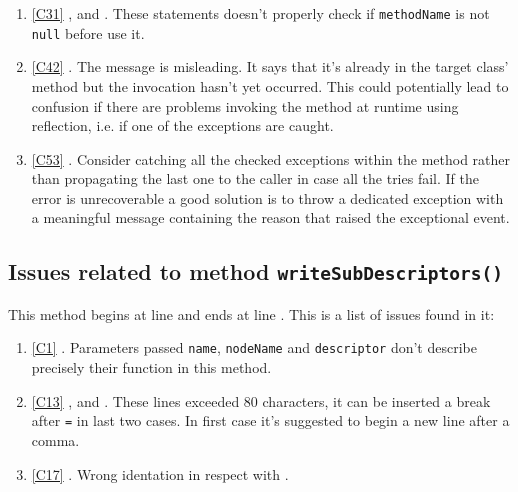 \begin{enumerate}
	\item \ref{C31} ,  and . These statements doesn't properly check if \texttt{methodName} is not \texttt{null} before use it.
	\item \ref{C42} . The message is misleading. It says that it's already in the target class' method but the invocation hasn't yet occurred. This could potentially lead to confusion if there are problems invoking the method at runtime using reflection, i.e. if one of the exceptions are caught.
	\item \ref{C53} . Consider catching all the checked exceptions within the method rather than propagating the last one to the caller in case all the tries fail. If the error is unrecoverable a good solution is to throw a dedicated exception with a meaningful message containing the reason that raised the exceptional event. 
\end{enumerate}

\subsection{Issues related to method \texttt{writeSubDescriptors()}}
This method begins at line  and ends at line . This is a list of issues found in it:
\begin{enumerate}
\item \ref{C1} . Parameters passed \texttt{name}, \texttt{nodeName} and \texttt{descriptor} don't describe precisely their function in this method.
\item \ref{C13} ,  and . These lines exceeded 80 characters, it can be inserted a break after \texttt{=} in last two cases. In first case it's suggested to begin a new line after a comma.
\item \ref{C17} . Wrong identation in respect with . 
\end{enumerate}
